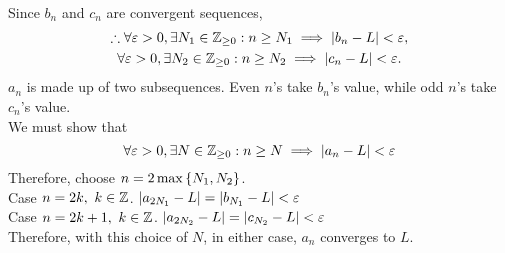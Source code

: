 \documentclass[a4paper,12pt]{report}
\begin{document}
\newpage
{}
\sol \\
Since $b_n$ and $c_n$ are convergent sequences,
\begin{gather*}
	\therefore\forall \varepsilon > 0, \exists N_1\in\mathbb{Z}_{\geq0}: n\geq N_1 \implies \left| b_n - L \right| < \varepsilon, \\
	\forall \varepsilon > 0, \exists N_2\in\mathbb{Z}_{\geq0}: n\geq N_2 \implies \left| c_n - L \right| < \varepsilon.
\end{gather*}
$a_n$ is made up of two subsequences. Even $n$'s take $b_n$'s value, while odd $n$'s take $c_n$'s value. \\
We must show that
$$
	\forall\varepsilon > 0, \exists N\in\mathbb{Z}_{\geq0}: n\geq N \implies \left| a_n - L \right| < \varepsilon
	$$
	Therefore, choose $n=2\max\left\lbrace N_1,N_2 \right\rbrace$. \\
Case $n=2k,\ k\in\mathbb{Z}$. $\left| a_{2N_1} - L \right| = \left| b_{N_1} - L \right| < \varepsilon$ \\
Case $n=2k+1,\ k\in\mathbb{Z}$. $\left| a_{2N_2} - L \right| = \left| c_{N_2} - L \right| < \varepsilon$ \\

Therefore, with this choice of $N$, in either case, $a_n$ converges to $L$.
\end{document}
